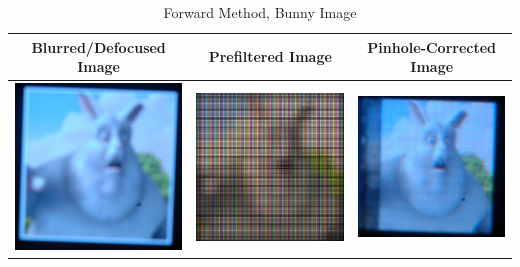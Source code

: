 \begin{table}[h!]
  \centering
     \caption {Forward Method, Bunny Image}
    \begin{tabular}{| c | c | c |}
    \hline Blurred/Defocused Image & Prefiltered Image & Pinhole-Corrected Image \\ \hline
      \includegraphics[width=1.9in]{chapters/chapter5/images/Shichao_Bunny_380_250_Origin.JPG} &
      \includegraphics[width=1.9in]{chapters/chapter5/images/Shichao_Bunny_Prefiltered.png} &
      \includegraphics[width=1.9in]{chapters/chapter5/images/Shichao_Bunny_380_250_Pinhole.JPG} \\ \hline
    \end{tabular}
\end{table}
 	 	 
